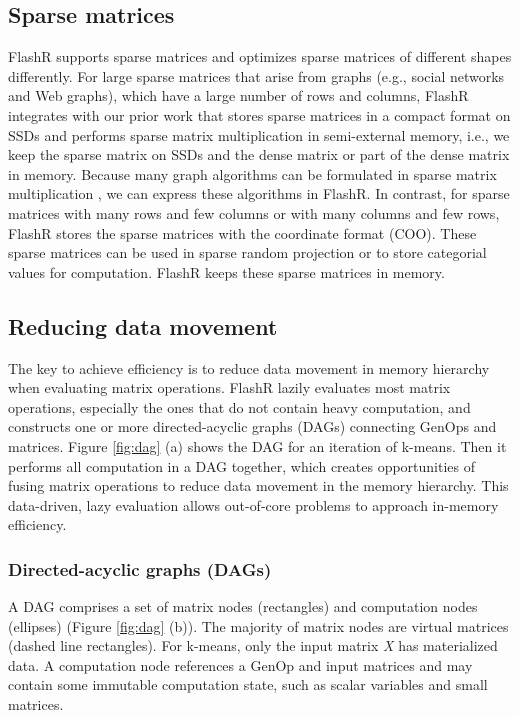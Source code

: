 \subsection{Sparse matrices}
FlashR supports sparse matrices and optimizes sparse matrices of different
shapes differently.
For large sparse matrices that arise from graphs (e.g., social networks
and Web graphs), which have a large number of rows and columns, FlashR integrates
with our prior work \cite{SEM_SpMM} that stores sparse matrices
in a compact format on SSDs and performs sparse matrix multiplication
in semi-external memory, i.e., we keep the sparse matrix on SSDs and
the dense matrix or part of the dense matrix in memory.
Because many graph algorithms can be formulated in sparse matrix multiplication
\cite{linear_algebra}, we can express these algorithms in FlashR. In contrast,
for sparse matrices with many rows and few columns or with many columns
and few rows, FlashR stores the sparse matrices with the coordinate format
(COO). These sparse matrices can be used in sparse random projection
\cite{sparse_proj} or to store categorial values for computation.
FlashR keeps these sparse matrices in memory.

\subsection{Reducing data movement}\label{sec:datamove}
The key to achieve efficiency is to reduce data movement in memory hierarchy
when evaluating matrix operations. FlashR lazily evaluates most matrix
operations, especially the ones that do not contain heavy computation,
and constructs one or more directed-acyclic graphs (DAGs) connecting GenOps and
matrices. Figure \ref{fig:dag} (a) shows the DAG for an iteration of k-means.
Then it performs all computation in a DAG together, which creates opportunities
of fusing matrix operations to reduce data movement in the memory hierarchy.
This data-driven, lazy evaluation allows out-of-core problems 
to approach in-memory efficiency.

\subsubsection{Directed-acyclic graphs (DAGs)} \label{dag}
A DAG comprises a set of matrix nodes (rectangles) and computation nodes
(ellipses) (Figure \ref{fig:dag} (b)). The majority of matrix nodes are
virtual matrices (dashed line rectangles).
For k-means, only the input matrix \textit{X} has materialized data.
A computation node references a GenOp and input matrices and
may contain some immutable computation state, such as scalar variables and
small matrices. 

